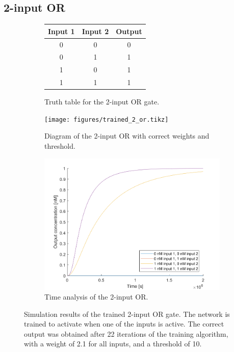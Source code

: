\subsection{2-input OR}

\begin{figure}[H]
  \begin{subfigure}[t]{.49\columnwidth}

      \centering
    \begin{tabular}[b]{ccc}
      \hline
    \multicolumn{1}{l}{\textbf{Input 1}} & \multicolumn{1}{l}{\textbf{Input 2}} & \multicolumn{1}{l}{\textbf{Output}} \\
    \hline
    0                                    & 0                                    & 0                                   \\
    0                                    & 1                                    & 1                                   \\
    1                                    & 0                                    & 1                                   \\
    1                                    & 1                                    & 1 \\
    \hline
    \end{tabular}
    \caption{Truth table for the 2-input OR gate.}
\end{subfigure}
\begin{subfigure}[t]{.49\textwidth}
  \texttt{[image: figures/trained\_2\_or.tikz]}
  \caption{Diagram of the 2-input OR with correct weights and threshold.}
\end{subfigure}
\hfill
\begin{subfigure}[t]{\textwidth}
  \centering
\includegraphics[width=\textwidth]{images/or_simulation.png}
\caption{Time analysis of the 2-input OR.}
\end{subfigure}
\caption{Simulation results of the trained 2-input OR gate. The network is trained to activate when one of the inputs is active. The correct output was obtained after 22 iterations of the training algorithm, with a weight of 2.1 for all inputs, and a threshold of 10.}
\label{2_or}
\end{figure}


